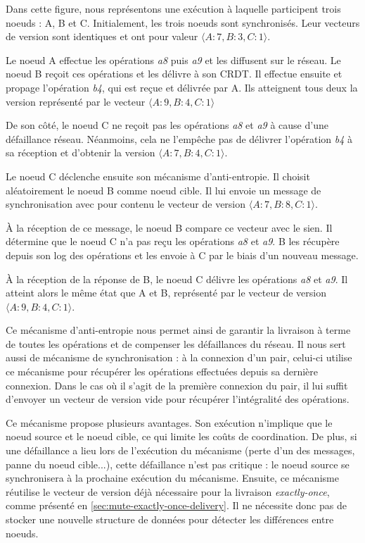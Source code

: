 \documentclass[12pt]{thesul}
\begin{document}
Dans cette figure, nous représentons une exécution à laquelle participent trois noeuds : A, B et C.
Initialement, les trois noeuds sont synchronisés.
Leur vecteurs de version sont identiques et ont pour valeur $\langle A:7,B:3,C:1 \rangle$.

Le noeud A effectue les opérations \emph{a8} puis \emph{a9} et les diffusent sur le réseau.
Le noeud B reçoit ces opérations et les délivre à son \ac{CRDT}.
Il effectue ensuite et propage l'opération \emph{b4}, qui est reçue et délivrée par A.
Ils atteignent tous deux la version représenté par le vecteur $\langle A:9,B:4,C:1 \rangle$

De son côté, le noeud C ne reçoit pas les opérations \emph{a8} et \emph{a9} à cause d'une défaillance réseau.
Néanmoins, cela ne l'empêche pas de délivrer l'opération \emph{b4} à sa réception et d'obtenir la version $\langle A:7,B:4,C:1 \rangle$.

Le noeud C déclenche ensuite son mécanisme d'anti-entropie.
Il choisit aléatoirement le noeud B comme noeud cible.
Il lui envoie un message de synchronisation avec pour contenu le vecteur de version $\langle A:7,B:8,C:1 \rangle$.

À la réception de ce message, le noeud B compare ce vecteur avec le sien.
Il détermine que le noeud C n'a pas reçu les opérations \emph{a8} et \emph{a9}.
B les récupère depuis son log des opérations et les envoie à C par le biais d'un nouveau message.

À la réception de la réponse de B, le noeud C délivre les opérations \emph{a8} et \emph{a9}.
Il atteint alors le même état que A et B, représenté par le vecteur de version $\langle A:9,B:4,C:1 \rangle$.

Ce mécanisme d'anti-entropie nous permet ainsi de garantir la livraison à terme de toutes les opérations et de compenser les défaillances du réseau.
Il nous sert aussi de mécanisme de synchronisation : à la connexion d'un pair, celui-ci utilise ce mécanisme pour récupérer les opérations effectuées depuis sa dernière connexion.
Dans le cas où il s'agit de la première connexion du pair, il lui suffit d'envoyer un vecteur de version vide pour récupérer l'intégralité des opérations.

Ce mécanisme propose plusieurs avantages.
Son exécution n'implique que le noeud source et le noeud cible, ce qui limite les coûts de coordination.
De plus, si une défaillance a lieu lors de l'exécution du mécanisme (perte d'un des messages, panne du noeud cible...), cette défaillance n'est pas critique : le noeud source se synchronisera à la prochaine exécution du mécanisme.
Ensuite, ce mécanisme réutilise le vecteur de version déjà nécessaire pour la livraison \emph{exactly-once}, comme présenté en \autoref{sec:mute-exactly-once-delivery}.
Il ne nécessite donc pas de stocker une nouvelle structure de données pour détecter les différences entre noeuds.
\end{document}

